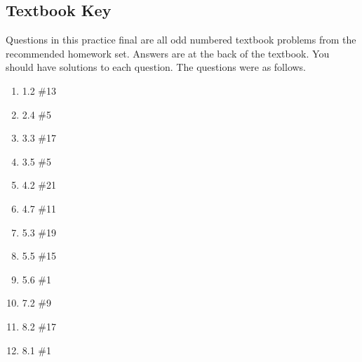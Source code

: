 \documentclass[12pt]{exam}
\begin{document}
\subsection*{Textbook Key}
Questions in this practice final are all odd numbered textbook problems from the recommended homework set. Answers are at the back of the textbook. You should have solutions to each question. The questions were as follows.

\begin{enumerate}
    \item 1.2 \#13
    \item 2.4 \#5
    \item 3.3 \#17
    \item 3.5 \#5
    \item 4.2 \#21
    \item 4.7 \#11
    \item 5.3 \#19 
    \item 5.5 \#15
    \item 5.6 \#1
    \item 7.2 \#9
    \item 8.2 \#17
    \item 8.1 \#1
\end{enumerate}
\end{document}
